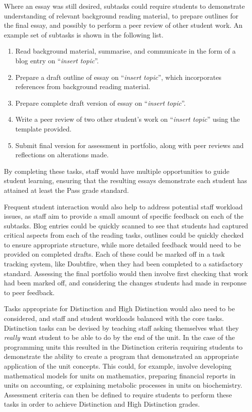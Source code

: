 Where an essay was still desired, subtasks could require students to demonstrate understanding of relevant background reading material, to prepare outlines for the final essay, and possibly to perform a peer review of other student work. An example set of subtasks is shown in the following list. 

\begin{enumerate}
	\item Read background material, summarise, and communicate in the form of a blog entry on ``\emph{insert topic}''.
	\item Prepare a draft outline of essay on ``\emph{insert topic}'', which incorporates references from background reading material.
	\item Prepare complete draft version of essay on ``\emph{insert topic}''.
	\item Write a peer review of two other student's work on ``\emph{insert topic}'' using the template provided. 
	\item Submit final version for assessment in portfolio, along with peer reviews and reflections on alterations made.
\end{enumerate}

By completing these tasks, staff would have multiple opportunities to guide student learning, ensuring that the resulting essays demonstrate each student has attained at least the Pass grade standard. 

Frequent student interaction would also help to address potential staff workload issues, as staff aim to provide a small amount of specific feedback on each of the subtasks. Blog entries could be quickly scanned to see that students had captured critical aspects from each of the reading tasks, outlines could be quickly checked to ensure appropriate structure, while more detailed feedback would need to be provided on completed drafts. Each of these could be marked off in a task tracking system, like Doubtfire, when they had been completed to a satisfactory standard. Assessing the final portfolio would then involve first checking that work had been marked off, and considering the changes students had made in response to peer feedback.

Tasks appropriate for Distinction and High Distinction would also need to be considered, and staff and student workloads balanced with the core tasks. Distinction tasks can be devised by teaching staff asking themselves what they \emph{really} want student to be able to do by the end of the unit. In the case of the programming units this resulted in the Distinction criteria requiring students to demonstrate the ability to create a program that demonstrated an appropriate application of the unit concepts. This could, for example, involve developing mathematical models for units on mathematics, preparing financial reports in units on accounting, or explaining metabolic processes in units on biochemistry. Assessment criteria can then be defined to require students to perform these tasks in order to achieve Distinction and High Distinction grades.

